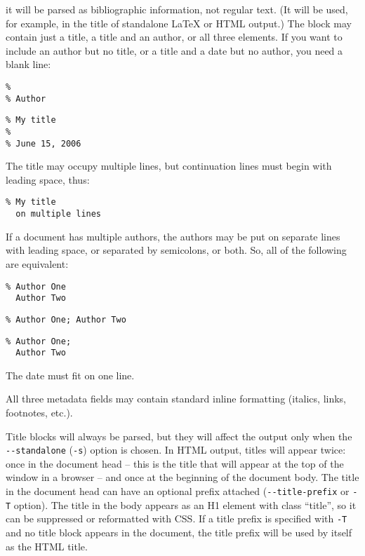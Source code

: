 \documentclass[]{article}
\begin{document}
it will be parsed as bibliographic information, not regular text. (It
will be used, for example, in the title of standalone LaTeX or HTML
output.) The block may contain just a title, a title and an author, or
all three elements. If you want to include an author but no title, or a
title and a date but no author, you need a blank line:

\begin{verbatim}
%
% Author
\end{verbatim}

\begin{verbatim}
% My title
%
% June 15, 2006
\end{verbatim}

The title may occupy multiple lines, but continuation lines must begin
with leading space, thus:

\begin{verbatim}
% My title
  on multiple lines
\end{verbatim}

If a document has multiple authors, the authors may be put on separate
lines with leading space, or separated by semicolons, or both. So, all
of the following are equivalent:

\begin{verbatim}
% Author One
  Author Two
\end{verbatim}

\begin{verbatim}
% Author One; Author Two
\end{verbatim}

\begin{verbatim}
% Author One;
  Author Two
\end{verbatim}

The date must fit on one line.

All three metadata fields may contain standard inline formatting
(italics, links, footnotes, etc.).

Title blocks will always be parsed, but they will affect the output only
when the \texttt{-\/-standalone} (\texttt{-s}) option is chosen. In HTML
output, titles will appear twice: once in the document head -- this is
the title that will appear at the top of the window in a browser -- and
once at the beginning of the document body. The title in the document
head can have an optional prefix attached (\texttt{-\/-title-prefix} or
\texttt{-T} option). The title in the body appears as an H1 element with
class ``title'', so it can be suppressed or reformatted with CSS. If a
title prefix is specified with \texttt{-T} and no title block appears in
the document, the title prefix will be used by itself as the HTML title.
\end{document}
